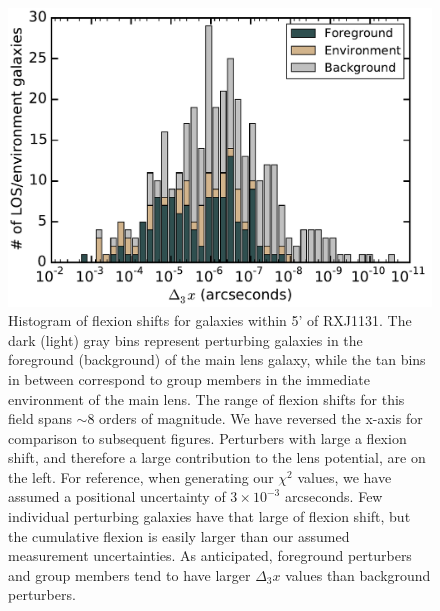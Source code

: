 \documentclass{emulateapj}
\begin{document}
\begin{figure}
\begin{center}
\includegraphics[width=1\columnwidth]{RXJ1131_dx3_hist.pdf}
\caption{\label{fig:d3xhist} Histogram of flexion shifts for galaxies within 5' of RXJ1131.  The dark (light) gray bins represent perturbing galaxies in the foreground (background) of the main lens galaxy, while the tan bins in between correspond to group members in the immediate environment of the main lens. The range of flexion shifts for this field spans $\sim 8$ orders of magnitude. We have reversed the x-axis for comparison to subsequent figures. Perturbers with large a flexion shift, and therefore a large contribution to the lens potential, are on the left. For reference, when generating our $\chi^2$ values, we have assumed a positional uncertainty of $3 \times 10^{-3}$ arcseconds. Few individual perturbing galaxies have that large of flexion shift, but the cumulative flexion is easily larger than our assumed measurement uncertainties. As anticipated, foreground perturbers and group members tend to have larger $\Delta_3 x$ values than background perturbers.}
\end{center}
\end{figure}
\end{document}
